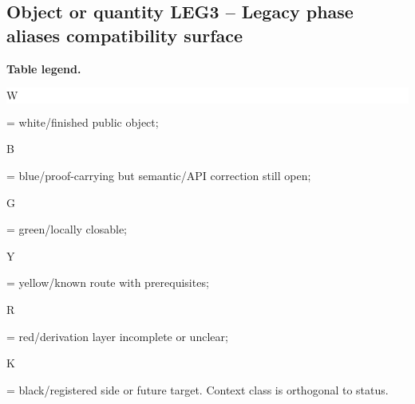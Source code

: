\subsection*{Object or quantity LEG3 -- Legacy phase aliases compatibility surface}
\hypertarget{objproof:LEG3}{}
\par\smallskip\noindent\begin{minipage}{0.99\linewidth}\footnotesize\raggedright\textbf{Table legend.} \colorbox{white}{\strut W} = white/finished public object; \colorbox{cyan!20}{\strut B} = blue/proof-carrying but semantic/API correction still open; \colorbox{green!18}{\strut G} = green/locally closable; \colorbox{yellow!25}{\strut Y} = yellow/known route with prerequisites; \colorbox{red!20}{\strut R} = red/derivation layer incomplete or unclear; \colorbox{black!18}{\strut K} = black/registered side or future target. Context class is orthogonal to status.\end{minipage}\par\vspace{0.25em}
